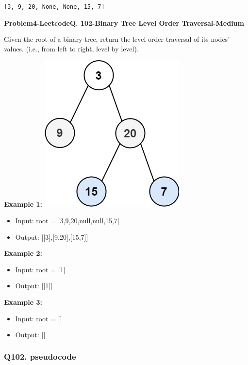 \documentclass[11pt]{article}
\providecommand{\tightlist}{%
      \setlength{\itemsep}{0pt}\setlength{\parskip}{0pt}}
\begin{document}
    \begin{Verbatim}[commandchars=\\\{\}]
[3, 9, 20, None, None, 15, 7]
    \end{Verbatim}

    \textbf{Problem4-LeetcodeQ. 102-Binary Tree Level Order
Traversal-Medium}

Given the root of a binary tree, return the level order traversal of its
nodes' values. (i.e., from left to right, level by level).

\textbf{Example 1:}
\includegraphics{896b03ec-fa75-4b76-b0de-69d3f23f255c.jpg}

\begin{itemize}
\tightlist
\item
  Input: root = {[}3,9,20,null,null,15,7{]}
\item
  Output: {[}{[}3{]},{[}9,20{]},{[}15,7{]}{]}
\end{itemize}

\textbf{Example 2:}

\begin{itemize}
\tightlist
\item
  Input: root = {[}1{]}
\item
  Output: {[}{[}1{]}{]}
\end{itemize}

\textbf{Example 3:}

\begin{itemize}
\tightlist
\item
  Input: root = {[}{]}
\item
  Output: {[}{]}
\end{itemize}

    \subsubsection{Q102. pseudocode}\label{q102.-pseudocode}
\end{document}

